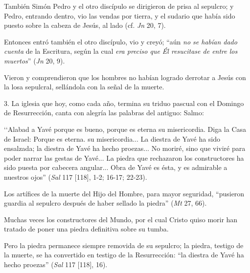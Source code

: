 			\begin{body}También Simón Pedro y el otro discípulo se dirigieron de prisa al sepulcro; y Pedro, entrando dentro, vio las vendas por tierra, y el sudario que había sido puesto sobre la cabeza de Jesús, al lado (cf. \textit{Jn} 20, 7).\end{body}
			
			\begin{body}Entonces entró también el otro discípulo, vio y creyó; “aún \textit{no se habían dado cuenta} de la Escritura, según la cual \textit{era preciso que Él resucitase de entre los muertos}” (\textit{Jn} 20, 9).\end{body}
			
			\begin{body}Vieron y comprendieron que los hombres no habían logrado derrotar a Jesús con la losa sepulcral, sellándola con la señal de la muerte.\end{body}
			
			\begin{body}3. La iglesia que hoy, como cada año, termina su triduo pascual con el Domingo de Resurrección, canta con alegría las palabras del antiguo: Salmo: \end{body}
			
			\begin{body}‘‘Alabad a Yavé porque es bueno, porque es eterna su misericordia. Diga la Casa de Israel: Porque es eterna. su misericordia... La diestra de Yavé ha sido ensalzada; la diestra de Yavé ha hecho proezas... No moriré, sino que viviré para poder narrar las gestas de Yavé... La piedra que rechazaron los constructores ha sido puesta por cabecera angular... Obra de Yavé es ésta, y es admirable a nuestros ojos” (\textit{Sal} 117 [118], 1-2; 16-17; 22-23).\end{body}
			
			\begin{body}Los artífices de la muerte del Hijo del Hombre, para mayor seguridad, “pusieron guardia al sepulcro después de haber sellado la piedra” (\textit{Mt} 27, 66).\end{body}
			
			\begin{body}Muchas veces los constructores del Mundo, por el cual Cristo quiso morir han tratado de poner una piedra definitiva sobre su tumba.\end{body}
			
			\begin{body}Pero la piedra permanece siempre removida de su sepulcro; la piedra, testigo de la muerte, se ha convertido en testigo de la Resurrección: “la diestra de Yavé ha hecho proezas” (\textit{Sal} 117 [118], 16).\end{body}
			
